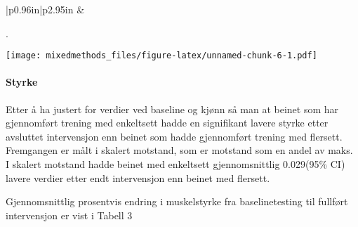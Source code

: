 \documentclass[
]{article}
\begin{document}
\begin{longtable}[c]{|p{0.96in}|p{2.95in}}
 &  \\

\noalign{\global\setlength{\arrayrulewidth}{2pt}}



\end{longtable}

.

\texttt{[image: mixedmethods\_files/figure-latex/unnamed-chunk-6-1.pdf]}

\hypertarget{styrke}{%
\paragraph{Styrke}\label{styrke}}

Etter å ha justert for verdier ved baseline og kjønn så man at beinet
som har gjennomført trening med enkeltsett hadde en signifikant lavere
styrke etter avsluttet intervensjon enn beinet som hadde gjennomført
trening med flersett. Fremgangen er målt i skalert motstand, som er
motstand som en andel av maks. I skalert motstand hadde beinet med
enkeltsett gjennomsnittlig 0.029(95\% CI) lavere verdier etter endt
intervensjon enn beinet med flersett.

Gjennomsnittlig prosentvis endring i muskelstyrke fra baselinetesting
til fullført intervensjon er vist i Tabell 3

\providecommand{\docline}[3]{\noalign{\global\setlength{\arrayrulewidth}{#1}}\arrayrulecolor[HTML]{#2}\cline{#3}}

\setlength{\tabcolsep}{2pt}

\renewcommand*{\arraystretch}{1.5}
\end{document}
